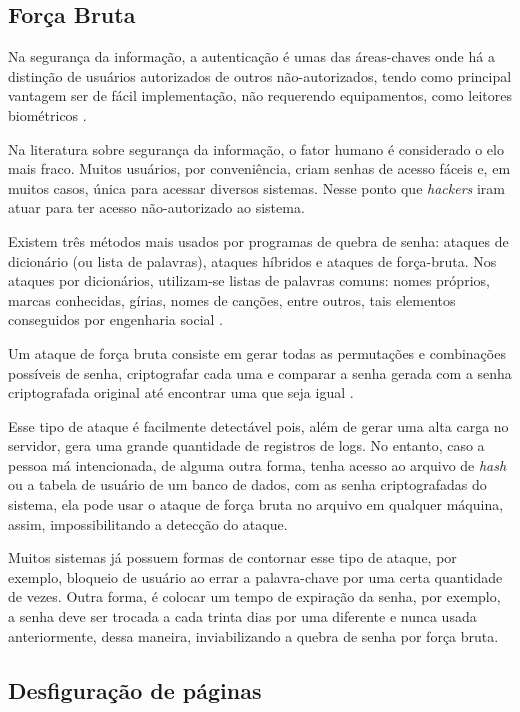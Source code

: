 \subsection{Força Bruta} \label{sec:forçabruta}

Na segurança da informação, a autenticação é umas das áreas-chaves onde há a distinção de usuários autorizados de outros não-autorizados, tendo como principal vantagem ser de fácil implementação, não requerendo equipamentos, como leitores biométricos \cite{denise-lilian}.

Na literatura sobre segurança da informação, o fator humano é considerado o elo mais fraco. Muitos usuários, por conveniência, criam senhas de acesso fáceis e, em muitos casos, única para acessar diversos sistemas. Nesse ponto que \textit{hackers} iram atuar para ter acesso não-autorizado ao sistema. 

Existem três métodos mais usados por programas de quebra de senha: ataques de dicionário (ou lista de palavras), ataques híbridos e ataques de força-bruta. Nos ataques por dicionários, utilizam-se listas de palavras comuns: nomes próprios, marcas conhecidas, gírias, nomes de canções, entre outros, tais elementos conseguidos por engenharia social \cite{univhacker}. 

 Um ataque de força bruta consiste em gerar todas as permutações e combinações possíveis de senha, criptografar cada uma e comparar a senha gerada com a senha criptografada original até encontrar uma que seja igual \cite{md5crack2012}. 

 Esse tipo de ataque é facilmente detectável pois, além de gerar uma alta carga no servidor, gera uma grande quantidade de registros de logs. No entanto, caso a pessoa má intencionada, de alguma outra forma, tenha acesso ao arquivo de \textit{hash} ou a tabela de usuário de um banco de dados, com as senha criptografadas do sistema, ela pode usar o ataque de força bruta no arquivo em qualquer máquina, assim, impossibilitando a detecção do ataque.

 Muitos sistemas já possuem formas de contornar esse tipo de ataque, por exemplo, bloqueio de usuário ao errar a palavra-chave por uma certa quantidade de vezes. Outra forma, é colocar um tempo de expiração da senha, por exemplo, a senha deve ser trocada a cada trinta dias por uma diferente e nunca usada anteriormente, dessa maneira, inviabilizando a quebra de senha por força bruta. 

\subsection{Desfiguração de páginas} \label{sec:desfiguração}

